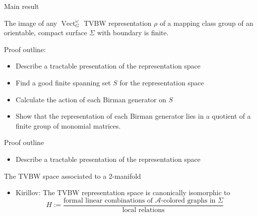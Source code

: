 \documentclass{beamer}
\DeclareMathOperator{\Vect}{Vect}
\begin{document}
\begin{frame}{Main result}
\begin{theorem}[G]
The image of any $\Vect^\omega_G$ TVBW representation $\rho$ of a mapping class group of an orientable, compact surface $\Sigma$ with boundary is finite.
\end{theorem}
Proof outline:
\begin{itemize}
  \item Describe a tractable presentation of  the representation space
  \item Find a good finite spanning set $S$ for the representation space
  \item Calculate the action of each Birman generator on $S$
  \item Show that the representation of each Birman generator lies in a quotient of a finite group of monomial matrices.  
\end{itemize}
\end{frame}

\begin{frame}{Proof outline}
\begin{itemize}
  \item Describe a tractable presentation of  the representation space
\end{itemize}
\end{frame}

\begin{frame}{The TVBW space associated to a 2-manifold}
  \begin{itemize}
    \item 
        Kirillov: The TVBW representation space is canonically isomorphic to
        \[
        H := \frac{\text{formal linear combinations of $\mathcal A$-colored graphs in $\Sigma$}  }
        {\text{local relations}}
       \]
  \end{itemize}

\end{frame}
\end{document}
